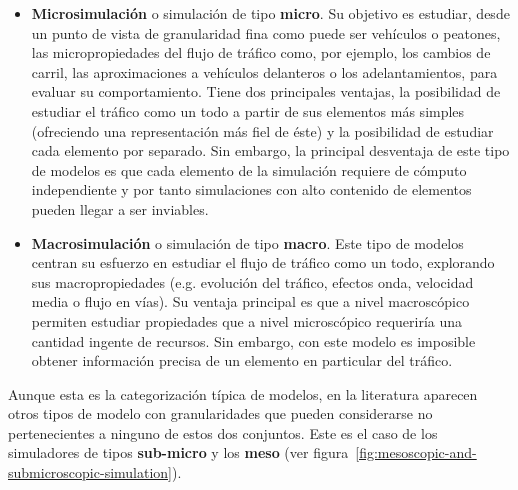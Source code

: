 \begin{itemize}
	\item \textbf{Microsimulación} o simulación de tipo \textbf{micro}. Su objetivo es estudiar, desde un punto de vista de granularidad fina como puede ser vehículos o peatones, las micropropiedades del flujo de tráfico como, por ejemplo, los cambios de carril, las aproximaciones a vehículos delanteros o los adelantamientos, para evaluar su comportamiento. Tiene dos principales ventajas, la posibilidad de estudiar el tráfico como un todo a partir de sus elementos más simples (ofreciendo una representación más fiel de éste) y la posibilidad de estudiar cada elemento por separado. Sin embargo, la principal desventaja de este tipo de modelos es que cada elemento de la simulación requiere de cómputo independiente y por tanto simulaciones con alto contenido de elementos pueden llegar a ser inviables.
	\item \textbf{Macrosimulación} o simulación de tipo \textbf{macro}. Este tipo de modelos centran su esfuerzo en estudiar el flujo de tráfico como un todo, explorando sus macropropiedades (e.g. evolución del tráfico, efectos onda, velocidad media o flujo en vías). Su ventaja principal es que a nivel macroscópico permiten estudiar propiedades que a nivel microscópico requeriría una cantidad ingente de recursos. Sin embargo, con este modelo es imposible obtener información precisa de un elemento en particular del tráfico.
\end{itemize}

Aunque esta es la categorización típica de modelos, en la literatura aparecen otros tipos de modelo con granularidades que pueden considerarse no pertenecientes a ninguno de estos dos conjuntos. Este es el caso de los simuladores de tipos \textbf{sub-micro} y los \textbf{meso} (ver figura~\ref{fig:mesoscopic-and-submicroscopic-simulation}). 

